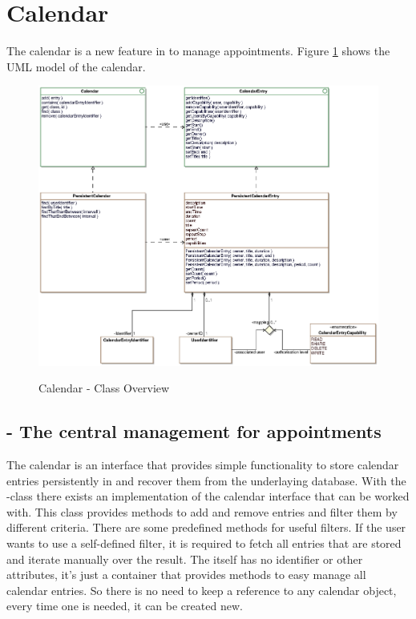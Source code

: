 \newpage
\section{Calendar}

The calendar is a new feature in \salespoint{} to manage appointments.
Figure \ref{calendar_overview} shows the UML model of the calendar.

\begin{figure}[ht]
	\centering
  \includegraphics[width=1.0\textwidth]{images/Calendar_Overview.eps}
	\label{calendar_overview}
	\caption{Calendar - Class Overview}
\end{figure}

\subsection{ - The central management for appointments}
The calendar is an interface that provides simple functionality to store calendar entries persistently in and recover them from the underlaying database.
With the -class there exists an implementation of the calendar interface that can be worked with. This class provides methods
to add and remove entries and filter them by different criteria.
There are some predefined methods for useful filters. If the user wants to use a self-defined filter, it is required to fetch all entries that are stored and
iterate manually over the result.  
The  itself has no identifier or other attributes, it's just a container that provides methods to easy manage all calendar entries.
So there is no need to keep a reference to any calendar object, every time one is needed, it can be created new.


